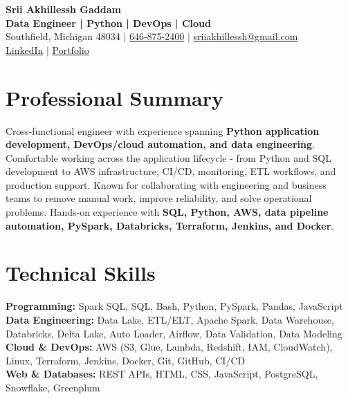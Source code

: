 \documentclass[letterpaper,10pt]{article}
\begin{document}
\fontsize{9.35pt}{10.45pt}\selectfont

\begin{center}
    {\LARGE \textbf{Srii Akhillessh Gaddam}} \\[-1pt]
    \textbf{Data Engineer | Python | DevOps | Cloud} \\[2pt]
    Southfield, Michigan 48034 $|$
    \href{tel:6468752400}{646-875-2400} $|$
    \href{mailto:sriiakhillessh@gmail.com}{sriiakhillessh@gmail.com} \\[1pt]
    \href{https://www.linkedin.com/in/srii-akhiilessh-gaddam-b48668191/}{LinkedIn} $|$
    \href{https://sriiakhillesshg.github.io/portfolio/}{Portfolio}
\end{center}
\vspace{-8pt}

\section{Professional Summary}
\small{Cross-functional engineer with experience spanning \textbf{Python application development, DevOps/cloud automation, and data engineering}. Comfortable working across the application lifecycle - from Python and SQL development to AWS infrastructure, CI/CD, monitoring, ETL workflows, and production support. Known for collaborating with engineering and business teams to remove manual work, improve reliability, and solve operational problems. Hands-on experience with \textbf{SQL, Python, AWS, data pipeline automation, PySpark, Databricks, Terraform, Jenkins, and Docker}.}

\section{Technical Skills}
\small{
\textbf{Programming:} Spark SQL, SQL, Bash, Python, PySpark, Pandas, JavaScript \\
\textbf{Data Engineering:} Data Lake, ETL/ELT, Apache Spark, Data Warehouse, Databricks, Delta Lake, Auto Loader, Airflow, Data Validation, Data Modeling \\
\textbf{Cloud \& DevOps:} AWS (S3, Glue, Lambda, Redshift, IAM, CloudWatch), Linux, Terraform, Jenkins, Docker, Git, GitHub, CI/CD \\
\textbf{Web \& Databases:} REST APIs, HTML, CSS, JavaScript, PostgreSQL, Snowflake, Greenplum
}
\end{document}
